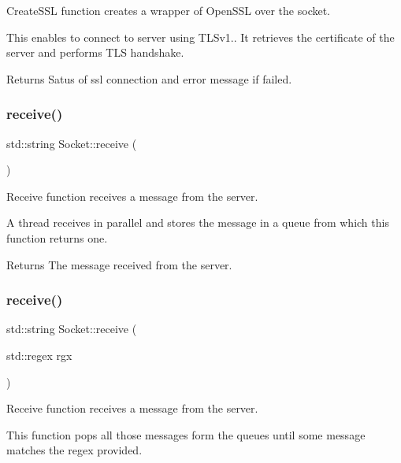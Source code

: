 Create\+S\+SL function creates a wrapper of Open\+S\+SL over the socket. 

This enables to connect to server using T\+L\+Sv1.. It retrieves the certificate of the server and performs T\+LS handshake. \begin{DoxyReturn}{Returns}
Satus of ssl connection and error message if failed. 
\end{DoxyReturn}
\mbox{\label{classSocket_a93675446d84c9856a4d7493f99d1e064}} 
\subsubsection{\texorpdfstring{receive()}{receive()}\hspace{0.1cm}{\footnotesize\ttfamily [1/2]}}
{\footnotesize\ttfamily std\+::string Socket\+::receive (\begin{DoxyParamCaption}{ }\end{DoxyParamCaption})}



Receive function receives a message from the server. 

A thread receives in parallel and stores the message in a queue from which this function returns one. \begin{DoxyReturn}{Returns}
The message received from the server. 
\end{DoxyReturn}
\mbox{\label{classSocket_af96bcd8ddc3bc16f451a6142fff0ddde}} 
\subsubsection{\texorpdfstring{receive()}{receive()}\hspace{0.1cm}{\footnotesize\ttfamily [2/2]}}
{\footnotesize\ttfamily std\+::string Socket\+::receive (\begin{DoxyParamCaption}\item[{std\+::regex}]{rgx }\end{DoxyParamCaption})}



Receive function receives a message from the server. 

This function pops all those messages form the queues until some message matches the regex provided.


